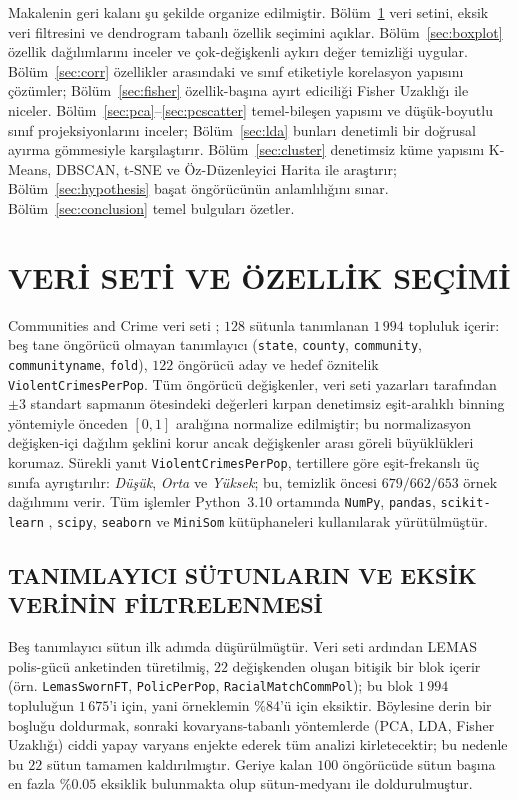\documentclass{ieeeaccess}
\begin{document}
Makalenin geri kalanı şu şekilde organize edilmiştir. Bölüm~\ref{sec:dataset} veri setini, eksik veri filtresini ve dendrogram tabanlı özellik seçimini açıklar. Bölüm~\ref{sec:boxplot} özellik dağılımlarını inceler ve çok-değişkenli aykırı değer temizliği uygular. Bölüm~\ref{sec:corr} özellikler arasındaki ve sınıf etiketiyle korelasyon yapısını çözümler; Bölüm~\ref{sec:fisher} özellik-başına ayırt ediciliği Fisher Uzaklığı ile niceler. Bölüm~\ref{sec:pca}--\ref{sec:pcscatter} temel-bileşen yapısını ve düşük-boyutlu sınıf projeksiyonlarını inceler; Bölüm~\ref{sec:lda} bunları denetimli bir doğrusal ayırma gömmesiyle karşılaştırır. Bölüm~\ref{sec:cluster} denetimsiz küme yapısını K-Means, DBSCAN, t-SNE ve Öz-Düzenleyici Harita ile araştırır; Bölüm~\ref{sec:hypothesis} başat öngörücünün anlamlılığını sınar. Bölüm~\ref{sec:conclusion} temel bulguları özetler.

\section{VERİ SETİ VE ÖZELLİK SEÇİMİ}
\label{sec:dataset}
Communities and Crime veri seti \cite{uciccrime}; $128$ sütunla tanımlanan $1\,994$ topluluk içerir: beş tane öngörücü olmayan tanımlayıcı (\texttt{state}, \texttt{county}, \texttt{community}, \texttt{communityname}, \texttt{fold}), $122$ öngörücü aday ve hedef öznitelik \texttt{ViolentCrimesPerPop}. Tüm öngörücü değişkenler, veri seti yazarları tarafından $\pm 3$ standart sapmanın ötesindeki değerleri kırpan denetimsiz eşit-aralıklı binning yöntemiyle önceden $[0,1]$ aralığına normalize edilmiştir; bu normalizasyon değişken-içi dağılım şeklini korur ancak değişkenler arası göreli büyüklükleri korumaz. Sürekli yanıt \texttt{ViolentCrimesPerPop}, tertillere göre eşit-frekanslı üç sınıfa ayrıştırılır: \emph{Düşük}, \emph{Orta} ve \emph{Yüksek}; bu, temizlik öncesi $679 / 662 / 653$ örnek dağılımını verir. Tüm işlemler Python~3.10 ortamında \texttt{NumPy}, \texttt{pandas}, \texttt{scikit-learn} \cite{pedregosa}, \texttt{scipy}, \texttt{seaborn} ve \texttt{MiniSom} \cite{minisom} kütüphaneleri kullanılarak yürütülmüştür.

\subsection{TANIMLAYICI SÜTUNLARIN VE EKSİK VERİNİN FİLTRELENMESİ}
\label{ssec:miss}
Beş tanımlayıcı sütun ilk adımda düşürülmüştür. Veri seti ardından LEMAS polis-gücü anketinden türetilmiş, $22$ değişkenden oluşan bitişik bir blok içerir (örn. \texttt{LemasSwornFT}, \texttt{PolicPerPop}, \texttt{RacialMatchCommPol}); bu blok $1\,994$ topluluğun $1\,675$'i için, yani örneklemin $\%84$'ü için eksiktir. Böylesine derin bir boşluğu doldurmak, sonraki kovaryans-tabanlı yöntemlerde (PCA, LDA, Fisher Uzaklığı) ciddi yapay varyans enjekte ederek tüm analizi kirletecektir; bu nedenle bu $22$ sütun tamamen kaldırılmıştır. Geriye kalan $100$ öngörücüde sütun başına en fazla $\%0.05$ eksiklik bulunmakta olup sütun-medyanı ile doldurulmuştur.
\end{document}
